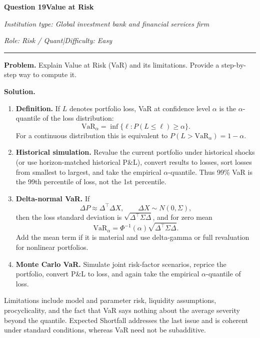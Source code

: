 \documentclass[11pt,letterpaper,openany]{book}
\newcommand{\InterviewQuestionHeader}[5]{%
  \vspace{1.0em}%
  {\large\bfseries #1\enspace #4\par}%
  {\small\itshape Institution type: #2\par}%
  {\small\itshape Role: #3\enspace |\enspace Difficulty: #5\par}%
  \vspace{0.25em}\hrule\vspace{0.45em}%
}
\begin{document}
\InterviewQuestionHeader{Question 19}{Global investment bank and financial services firm}{Risk / Quant}{Value at Risk}{Easy}
\textbf{Problem.} Explain Value at Risk (VaR) and its limitations. Provide a step-by-step way to compute it.

\textbf{Solution.}


\begin{enumerate}
\item \textbf{Definition.} If \(L\) denotes portfolio loss, VaR at confidence level \(\alpha\) is the \(\alpha\)-quantile of the loss distribution:
\[
\mathrm{VaR}_\alpha=\inf\{\ell:P(L\le\ell)\ge\alpha\}.
\]
For a continuous distribution this is equivalent to \(P(L>\mathrm{VaR}_\alpha)=1-\alpha\).

\item \textbf{Historical simulation.} Revalue the current portfolio under historical shocks (or use horizon-matched historical P\&L), convert results to losses, sort losses from smallest to largest, and take the empirical \(\alpha\)-quantile. Thus 99\% VaR is the 99th percentile of loss, not the 1st percentile.

\item \textbf{Delta-normal VaR.} If
\[
\Delta P\approx \Delta^\top\Delta X,
\qquad \Delta X\sim N(0,\Sigma),
\]
then the loss standard deviation is \(\sqrt{\Delta^\top\Sigma\Delta}\), and for zero mean
\[
\mathrm{VaR}_\alpha=\Phi^{-1}(\alpha)\sqrt{\Delta^\top\Sigma\Delta}.
\]
Add the mean term if it is material and use delta-gamma or full revaluation for nonlinear portfolios.

\item \textbf{Monte Carlo VaR.} Simulate joint risk-factor scenarios, reprice the portfolio, convert P\&L to loss, and again take the empirical \(\alpha\)-quantile of loss.
\end{enumerate}

Limitations include model and parameter risk, liquidity assumptions, procyclicality, and the fact that VaR says nothing about the average severity beyond the quantile. Expected Shortfall addresses the last issue and is coherent under standard conditions, whereas VaR need not be subadditive.
\end{document}
